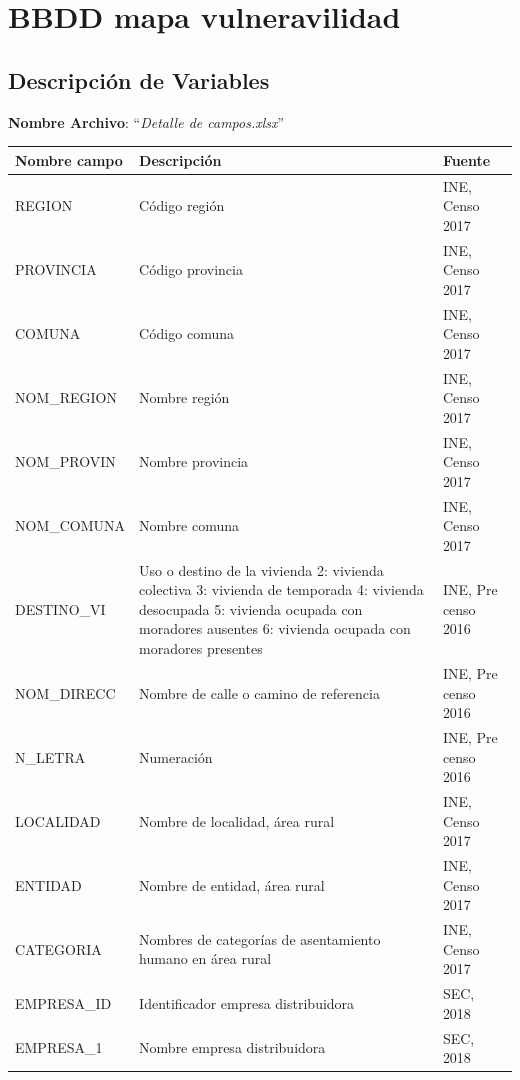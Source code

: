 \documentclass[
]{book}
\begin{document}
\hypertarget{bbdd-mapa-vulneravilidad}{%
\section{BBDD mapa vulneravilidad}\label{bbdd-mapa-vulneravilidad}}

\hypertarget{descripciuxf3n-de-variables}{%
\subsection{Descripción de Variables}\label{descripciuxf3n-de-variables}}

\textbf{Nombre Archivo}: ``\emph{Detalle de campos.xlsx}''

\begingroup\fontsize{11}{13}\selectfont

\begin{tabu} to 
\hline
Nombre campo & Descripción & Fuente\\
\hline
REGION & Código región & INE, Censo 2017\\
\hline
PROVINCIA & Código provincia & INE, Censo 2017\\
\hline
COMUNA & Código comuna & INE, Censo 2017\\
\hline
NOM\_REGION & Nombre región & INE, Censo 2017\\
\hline
NOM\_PROVIN & Nombre provincia & INE, Censo 2017\\
\hline
NOM\_COMUNA & Nombre comuna & INE, Censo 2017\\
\hline
DESTINO\_VI & Uso o destino de la vivienda 
2: vivienda colectiva
3: vivienda de temporada
4: vivienda desocupada
5: vivienda ocupada con moradores ausentes
6: vivienda ocupada con moradores presentes & INE, Pre censo 2016\\
\hline
NOM\_DIRECC & Nombre de calle o camino de referencia & INE, Pre censo 2016\\
\hline
N\_LETRA & Numeración & INE, Pre censo 2016\\
\hline
LOCALIDAD & Nombre de localidad, área rural & INE, Censo 2017\\
\hline
ENTIDAD & Nombre de entidad, área rural & INE, Censo 2017\\
\hline
CATEGORIA & Nombres de categorías de asentamiento humano en área rural & INE, Censo 2017\\
\hline
EMPRESA\_ID & Identificador empresa distribuidora & SEC, 2018\\
\hline
EMPRESA\_1 & Nombre empresa distribuidora & SEC, 2018\\

\end{tabu}
\end{document}
